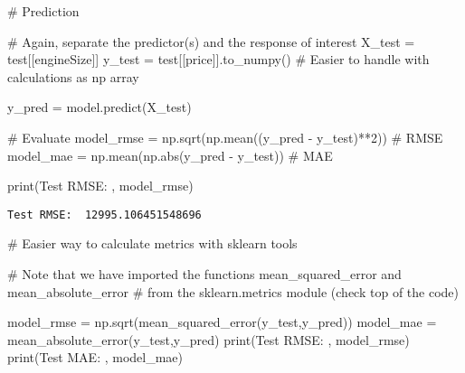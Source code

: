 \documentclass[
  letterpaper,
  DIV=11,
  numbers=noendperiod]{scrreprt}
\newenvironment{Shaded}{\begin{snugshade}}{\end{snugshade}}
\newcommand{\BuiltInTok}[1]{\textcolor[rgb]{0.00,0.23,0.31}{#1}}
\newcommand{\CommentTok}[1]{\textcolor[rgb]{0.37,0.37,0.37}{#1}}
\newcommand{\DecValTok}[1]{\textcolor[rgb]{0.68,0.00,0.00}{#1}}
\newcommand{\NormalTok}[1]{\textcolor[rgb]{0.00,0.23,0.31}{#1}}
\newcommand{\OperatorTok}[1]{\textcolor[rgb]{0.37,0.37,0.37}{#1}}
\newcommand{\StringTok}[1]{\textcolor[rgb]{0.13,0.47,0.30}{#1}}
\begin{document}
\begin{Shaded}
\begin{Highlighting}[]
\CommentTok{\# Prediction}

\CommentTok{\# Again, separate the predictor(s) and the response of interest}
\NormalTok{X\_test }\OperatorTok{=}\NormalTok{ test[[}\StringTok{\textquotesingle{}engineSize\textquotesingle{}}\NormalTok{]]}
\NormalTok{y\_test }\OperatorTok{=}\NormalTok{ test[[}\StringTok{\textquotesingle{}price\textquotesingle{}}\NormalTok{]].to\_numpy() }\CommentTok{\# Easier to handle with calculations as np array}

\NormalTok{y\_pred }\OperatorTok{=}\NormalTok{ model.predict(X\_test)}

\CommentTok{\# Evaluate}
\NormalTok{model\_rmse }\OperatorTok{=}\NormalTok{ np.sqrt(np.mean((y\_pred }\OperatorTok{{-}}\NormalTok{ y\_test)}\OperatorTok{**}\DecValTok{2}\NormalTok{)) }\CommentTok{\# RMSE}
\NormalTok{model\_mae }\OperatorTok{=}\NormalTok{ np.mean(np.}\BuiltInTok{abs}\NormalTok{(y\_pred }\OperatorTok{{-}}\NormalTok{ y\_test)) }\CommentTok{\# MAE}

\BuiltInTok{print}\NormalTok{(}\StringTok{\textquotesingle{}Test RMSE: \textquotesingle{}}\NormalTok{, model\_rmse)}
\end{Highlighting}
\end{Shaded}

\begin{verbatim}
Test RMSE:  12995.106451548696
\end{verbatim}

\begin{Shaded}
\begin{Highlighting}[]
\CommentTok{\# Easier way to calculate metrics with sklearn tools}

\CommentTok{\# Note that we have imported the functions \textquotesingle{}mean\_squared\_error\textquotesingle{} and \textquotesingle{}mean\_absolute\_error\textquotesingle{}}
\CommentTok{\# from the sklearn.metrics module (check top of the code)}

\NormalTok{model\_rmse }\OperatorTok{=}\NormalTok{ np.sqrt(mean\_squared\_error(y\_test,y\_pred))}
\NormalTok{model\_mae }\OperatorTok{=}\NormalTok{ mean\_absolute\_error(y\_test,y\_pred)}
\BuiltInTok{print}\NormalTok{(}\StringTok{\textquotesingle{}Test RMSE: \textquotesingle{}}\NormalTok{, model\_rmse)}
\BuiltInTok{print}\NormalTok{(}\StringTok{\textquotesingle{}Test MAE: \textquotesingle{}}\NormalTok{, model\_mae)}
\end{Highlighting}
\end{Shaded}
\end{document}
